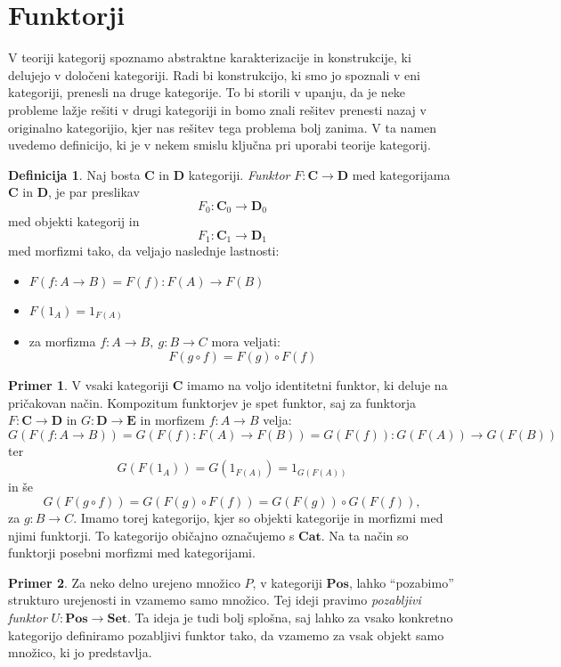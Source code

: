 \documentclass[12pt,a4paper]{book}
\theoremstyle{definition}
\newtheorem{definicija}{Definicija}[chapter]
\theoremstyle{plain}
\theoremstyle{definition}
\newtheorem{primer}{Primer}[section]
\theoremstyle{remark}
\newcommand{\cat}[1]{\textbf{#1}}
\begin{document}
\section{Funktorji}

V teoriji kategorij spoznamo abstraktne karakterizacije in konstrukcije, ki delujejo v določeni kategoriji. Radi bi konstrukcijo, ki smo jo spoznali v eni kategoriji, prenesli na druge kategorije. To bi storili v upanju, da je neke probleme lažje rešiti v drugi kategoriji in bomo znali rešitev prenesti nazaj v originalno kategorijio, kjer nas rešitev tega problema bolj zanima. V ta namen uvedemo definicijo, ki je v nekem smislu ključna pri uporabi teorije kategorij.

\begin{definicija}
Naj bosta $\cat{C}$ in $\cat{D}$ kategoriji. \emph{Funktor} $F : \cat{C} \to \cat{D}$ med kategorijama $\cat{C}$ in $\cat{D}$, je par preslikav
$$F_0 : \cat{C}_0 \to \cat{D}_0$$
med objekti kategorij in
$$F_1 : \cat{C}_1 \to \cat{D}_1$$
med morfizmi tako, da veljajo naslednje lastnosti:
\begin{itemize}
\item $F(f : A \to B) = F(f) : F(A) \to F(B)$
\item $F(1_A) = 1_{F(A)}$
\item za morfizma $f : A \to B, \ g : B \to C$ mora veljati:
$$F(g \circ f) = F(g) \circ F(f)$$
\end{itemize}
\end{definicija}

\begin{primer}
V vsaki kategoriji $\cat{C}$ imamo na voljo identitetni funktor, ki deluje na pričakovan način. Kompozitum funktorjev je spet funktor, saj za funktorja $F : \cat{C} \to \cat{D}$ in $G : \cat{D} \to \cat{E}$ in morfizem $f : A \to B$ velja:
$$G(F(f : A \to B)) = G(F(f) : F(A) \to F(B)) = G(F(f)) : G(F(A)) \to G(F(B))$$
ter
$$G(F(1_A)) = G(1_{F(A)}) = 1_{G(F(A))}$$
in še
$$G(F(g \circ f)) = G(F(g) \circ F(f)) = G(F(g)) \circ G(F(f)),$$
za $g : B \to C$. Imamo torej kategorijo, kjer so objekti kategorije in morfizmi med njimi funktorji. To kategorijo običajno označujemo s $\cat{Cat}$. Na ta način so funktorji posebni morfizmi med kategorijami.
\end{primer}

\begin{primer}
Za neko delno urejeno množico $P$, v kategoriji $\cat{Pos}$, lahko "`pozabimo"' strukturo urejenosti in vzamemo samo množico. Tej ideji pravimo \emph{pozabljivi funktor} $U : \cat{Pos} \to \cat{Set}$. Ta ideja je tudi bolj splošna, saj lahko za vsako konkretno kategorijo definiramo pozabljivi funktor tako, da vzamemo za vsak objekt samo množico, ki jo predstavlja.
\end{primer}
\end{document}
